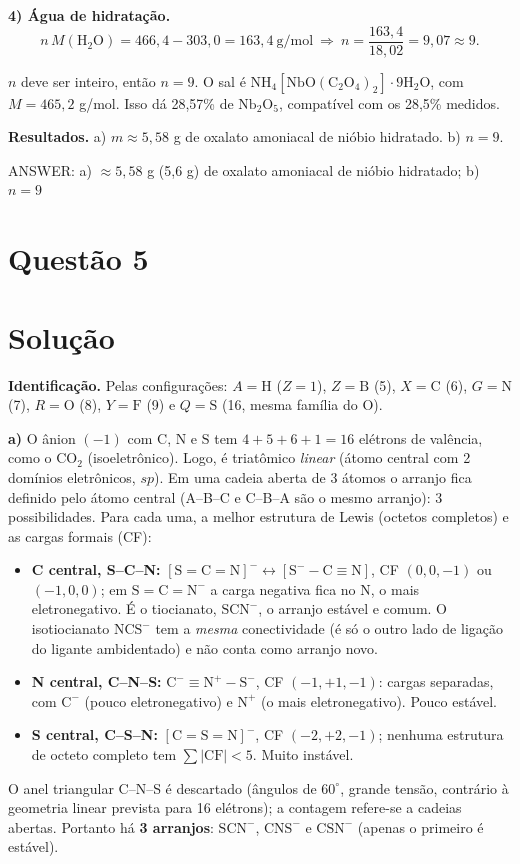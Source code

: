 \documentclass{article}%
\begin{document}
\textbf{4) Água de hidratação.}
\[
n\,M(\mathrm{H_2O})=466{,}4-303{,}0=163{,}4\ \text{g/mol}
\ \Rightarrow\
n=\frac{163{,}4}{18{,}02}=9{,}07\approx 9 .
\]

$n$ deve ser inteiro, então $n=9$. O sal é $\mathrm{NH_4[NbO(C_2O_4)_2]\cdot 9H_2O}$, com $M=465{,}2$ g/mol. Isso dá 28,57\% de $\mathrm{Nb_2O_5}$, compatível com os 28,5\% medidos.

\textbf{Resultados.} a) $m\approx 5{,}58$ g de oxalato amoniacal de nióbio hidratado. b) $n=9$.

ANSWER: a) $\approx 5{,}58$ g (5,6 g) de oxalato amoniacal de nióbio hidratado; b) $n = 9$%
\newpage%
\section*{Questão 5}

\section*{Solução}

\textbf{Identificação.} Pelas configurações: $A=\mathrm{H}$ ($Z=1$), $Z=\mathrm{B}$ (5), $X=\mathrm{C}$ (6), $G=\mathrm{N}$ (7), $R=\mathrm{O}$ (8), $Y=\mathrm{F}$ (9) e $Q=\mathrm{S}$ (16, mesma família do O).

\medskip
\textbf{a)} O ânion $(-1)$ com $\mathrm{C}$, $\mathrm{N}$ e $\mathrm{S}$ tem $4+5+6+1=16$ elétrons de valência, como o $\mathrm{CO_2}$ (isoeletrônico). Logo, é triatômico \emph{linear} (átomo central com 2 domínios eletrônicos, $sp$). Em uma cadeia aberta de 3 átomos o arranjo fica definido pelo átomo central (A--B--C e C--B--A são o mesmo arranjo): 3 possibilidades. Para cada uma, a melhor estrutura de Lewis (octetos completos) e as cargas formais (CF):
\begin{itemize}
\item \textbf{C central, S--C--N:} $[\mathrm{S{=}C{=}N}]^-\leftrightarrow[\mathrm{S^{-}{-}C{\equiv}N}]$, CF $(0,0,-1)$ ou $(-1,0,0)$; em $\mathrm{S{=}C{=}N^-}$ a carga negativa fica no N, o mais eletronegativo. É o tiocianato, $\mathrm{SCN^-}$, o arranjo estável e comum. O isotiocianato $\mathrm{NCS^-}$ tem a \emph{mesma} conectividade (é só o outro lado de ligação do ligante ambidentado) e não conta como arranjo novo.
\item \textbf{N central, C--N--S:} $\mathrm{C^{-}{\equiv}N^{+}{-}S^{-}}$, CF $(-1,+1,-1)$: cargas separadas, com $\mathrm{C^-}$ (pouco eletronegativo) e $\mathrm{N^+}$ (o mais eletronegativo). Pouco estável.
\item \textbf{S central, C--S--N:} $[\mathrm{C{=}S{=}N}]^-$, CF $(-2,+2,-1)$; nenhuma estrutura de octeto completo tem $\sum|\mathrm{CF}|<5$. Muito instável.
\end{itemize}
O anel triangular C--N--S é descartado (ângulos de $60^\circ$, grande tensão, contrário à geometria linear prevista para 16 elétrons); a contagem refere-se a cadeias abertas. Portanto há \textbf{3 arranjos}: $\mathrm{SCN^-}$, $\mathrm{CNS^-}$ e $\mathrm{CSN^-}$ (apenas o primeiro é estável).
\end{document}
